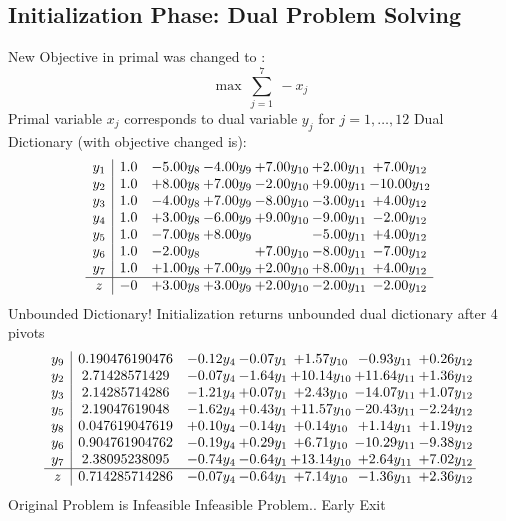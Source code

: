\documentclass[9pt]{article}
\begin{document}
\subsection{Initialization Phase: Dual Problem Solving}
New Objective in primal was changed to : \[ \max\ \sum_{j=1}^{7}\ - x_j \] 
Primal variable $x_j$ corresponds to dual variable $y_j$ for $j = 1,\ldots,12$
Dual Dictionary (with objective changed is): 
\[\begin{array}{c| c c@{\hskip 2pt} c@{\hskip 2pt} c@{\hskip 2pt} c@{\hskip 2pt} c@{\hskip 2pt} }
 y_{1}   &  1.0 & -5.00 y_{8} & -4.00 y_{9} & +  7.00 y_{10} & +  2.00 y_{11} & +  7.00 y_{12}\\
 y_{2}   &  1.0 & +  8.00 y_{8} & +  7.00 y_{9} & -2.00 y_{10} & +  9.00 y_{11} & -10.00 y_{12}\\
 y_{3}   &  1.0 & -4.00 y_{8} & +  7.00 y_{9} & -8.00 y_{10} & -3.00 y_{11} & +  4.00 y_{12}\\
 y_{4}   &  1.0 & +  3.00 y_{8} & -6.00 y_{9} & +  9.00 y_{10} & -9.00 y_{11} & -2.00 y_{12}\\
 y_{5}   &  1.0 & -7.00 y_{8} & +  8.00 y_{9} &   & -5.00 y_{11} & +  4.00 y_{12}\\
 y_{6}   &  1.0 & -2.00 y_{8} &   & +  7.00 y_{10} & -8.00 y_{11} & -7.00 y_{12}\\
 y_{7}   &  1.0 & +  1.00 y_{8} & +  7.00 y_{9} & +  2.00 y_{10} & +  8.00 y_{11} & +  4.00 y_{12}\\
\hline
z    &  -0 & +  3.00 y_{8} & +  3.00 y_{9} & +  2.00 y_{10} & -2.00 y_{11} & -2.00 y_{12}\\
\end{array}\]
Unbounded Dictionary!
Initialization returns unbounded dual dictionary after 4 pivots
\[\begin{array}{c| c c@{\hskip 2pt} c@{\hskip 2pt} c@{\hskip 2pt} c@{\hskip 2pt} c@{\hskip 2pt} }
 y_{9}   &  0.190476190476 & -0.12 y_{4} & -0.07 y_{1} & +  1.57 y_{10} & -0.93 y_{11} & +  0.26 y_{12}\\
 y_{2}   &  2.71428571429 & -0.07 y_{4} & -1.64 y_{1} & + 10.14 y_{10} & + 11.64 y_{11} & +  1.36 y_{12}\\
 y_{3}   &  2.14285714286 & -1.21 y_{4} & +  0.07 y_{1} & +  2.43 y_{10} & -14.07 y_{11} & +  1.07 y_{12}\\
 y_{5}   &  2.19047619048 & -1.62 y_{4} & +  0.43 y_{1} & + 11.57 y_{10} & -20.43 y_{11} & -2.24 y_{12}\\
 y_{8}   &  0.047619047619 & +  0.10 y_{4} & -0.14 y_{1} & +  0.14 y_{10} & +  1.14 y_{11} & +  1.19 y_{12}\\
 y_{6}   &  0.904761904762 & -0.19 y_{4} & +  0.29 y_{1} & +  6.71 y_{10} & -10.29 y_{11} & -9.38 y_{12}\\
 y_{7}   &  2.38095238095 & -0.74 y_{4} & -0.64 y_{1} & + 13.14 y_{10} & +  2.64 y_{11} & +  7.02 y_{12}\\
\hline
z    &  0.714285714286 & -0.07 y_{4} & -0.64 y_{1} & +  7.14 y_{10} & -1.36 y_{11} & +  2.36 y_{12}\\
\end{array}\]
Original Problem is Infeasible
Infeasible Problem.. Early Exit
\end{document}
